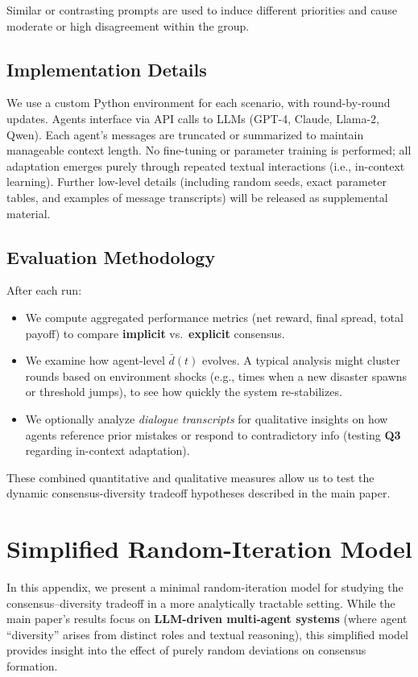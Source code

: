 \noindent Similar or contrasting prompts are used to induce different priorities and cause moderate or high disagreement within the group.

\subsection{Implementation Details}
We use a custom Python environment for each scenario, with round-by-round updates. Agents interface via API calls to LLMs (GPT-4, Claude, Llama-2, Qwen). Each agent’s messages are truncated or summarized to maintain manageable context length. No fine-tuning or parameter training is performed; all adaptation emerges purely through repeated textual interactions (i.e., in-context learning). Further low-level details (including random seeds, exact parameter tables, and examples of message transcripts) will be released as supplemental material.

\subsection{Evaluation Methodology}
After each run:
\begin{itemize}
    \item We compute aggregated performance metrics (net reward, final spread, total payoff) to compare \textbf{implicit} vs.\ \textbf{explicit} consensus. 
    \item We examine how agent-level \(\bar{d}(t)\) evolves. A typical analysis might cluster rounds based on environment shocks (e.g., times when a new disaster spawns or threshold jumps), to see how quickly the system re-stabilizes.
    \item We optionally analyze \emph{dialogue transcripts} for qualitative insights on how agents reference prior mistakes or respond to contradictory info (testing \textbf{Q3} regarding in-context adaptation).
\end{itemize}
These combined quantitative and qualitative measures allow us to test the dynamic consensus-diversity tradeoff hypotheses described in the main paper.

\section{Simplified Random-Iteration Model}
\label{sec:appendix:c}

In this appendix, we present a minimal random-iteration model for studying the consensus--diversity tradeoff in a more analytically tractable setting. While the main paper's results focus on \textbf{LLM-driven multi-agent systems} (where agent ``diversity'' arises from distinct roles and textual reasoning), this simplified model provides insight into the effect of purely random deviations on consensus formation.

